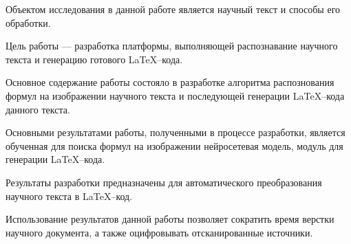 \abstract


Объектом исследования в данной работе является научный текст и способы его обработки.

Цель работы –-- разработка платформы, выполняющей распознавание научного текста и  генерацию готового \LaTeX--кода.

Основное содержание работы состояло в разработке алгоритма распознования формул на изображении научного текста и последующей генерации \LaTeX--кода данного текста.

Основными результатами работы, полученными в процессе разработки, является обученная для поиска формул на изображении нейросетевая модель, модуль для генерации \LaTeX--кода.

Результаты разработки предназначены для автоматического преобразования научного текста в \LaTeX--код.

Использование результатов данной работы позволяет сократить время верстки научного документа, а также оцифровывать отсканированные источники.
